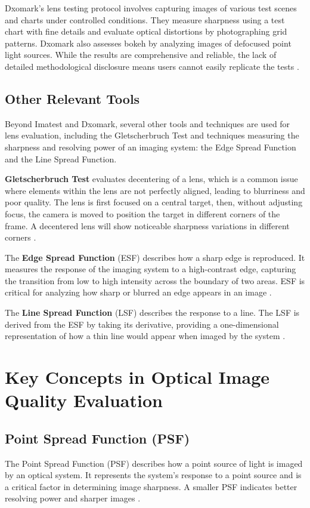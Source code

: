 Dxomark's lens testing protocol involves capturing images of various test scenes and charts under controlled conditions. They measure sharpness using a test chart with fine details and evaluate optical distortions by photographing grid patterns. Dxomark also assesses bokeh by analyzing images of defocused point light sources. While the results are comprehensive and reliable, the lack of detailed methodological disclosure means users cannot easily replicate the tests \cite{DxomarkBokeh}.

\subsection{Other Relevant Tools}
Beyond Imatest and Dxomark, several other tools and techniques are used for lens evaluation, including the Gletscherbruch Test and techniques measuring the sharpness and resolving power of an imaging system: the Edge Spread Function and the Line Spread Function.

\textbf{Gletscherbruch Test} evaluates decentering of a lens, which is a common issue where elements within the lens are not perfectly aligned, leading to blurriness and poor quality. The lens is first focused on a central target, then, without adjusting focus, the camera is moved to position the target in different corners of the frame. A decentered lens will show noticeable sharpness variations in different corners \cite{Gletscherbruch}.

The \textbf{Edge Spread Function} (ESF) describes how a sharp edge is reproduced. It measures the response of the imaging system to a high-contrast edge, capturing the transition from low to high intensity across the boundary of two areas. ESF is critical for analyzing how sharp or blurred an edge appears in an image \cite{ESF}.

The \textbf{Line Spread Function} (LSF) describes the response to a line. The LSF is derived from the ESF by taking its derivative, providing a one-dimensional representation of how a thin line would appear when imaged by the system \cite{ESF}.

\section{Key Concepts in Optical Image Quality Evaluation}

\subsection{Point Spread Function (PSF)}
The Point Spread Function (PSF) describes how a point source of light is imaged by an optical system. It represents the system's response to a point source and is a critical factor in determining image sharpness. A smaller PSF indicates better resolving power and sharper images \cite{PSFdescription}.


